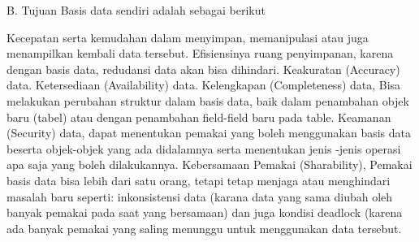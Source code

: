 \documentclass[a4paper,12 pt]{article}
\begin{document}
B. Tujuan Basis data sendiri adalah sebagai berikut

Kecepatan serta kemudahan dalam menyimpan, memanipulasi atau juga menampilkan kembali data tersebut.
Efisiensinya ruang penyimpanan, karena dengan basis data, redudansi data akan bisa dihindari.
Keakuratan (Accuracy) data.
Ketersediaan (Availability) data.
Kelengkapan (Completeness) data, Bisa melakukan perubahan struktur dalam basis data, baik dalam penambahan objek baru (tabel) atau dengan penambahan field-field baru pada table.
Keamanan (Security) data, dapat menentukan pemakai yang boleh menggunakan basis data beserta objek-objek yang ada didalamnya serta menentukan jenis -jenis operasi apa saja yang boleh dilakukannya.
Kebersamaan Pemakai (Sharability), Pemakai basis data bisa lebih dari satu orang, tetapi tetap menjaga atau menghindari masalah baru seperti: inkonsistensi data (karana data yang sama diubah oleh banyak pemakai pada saat yang bersamaan) dan juga kondisi deadlock (karena ada banyak pemakai yang saling menunggu untuk menggunakan data tersebut.
\end{document}
